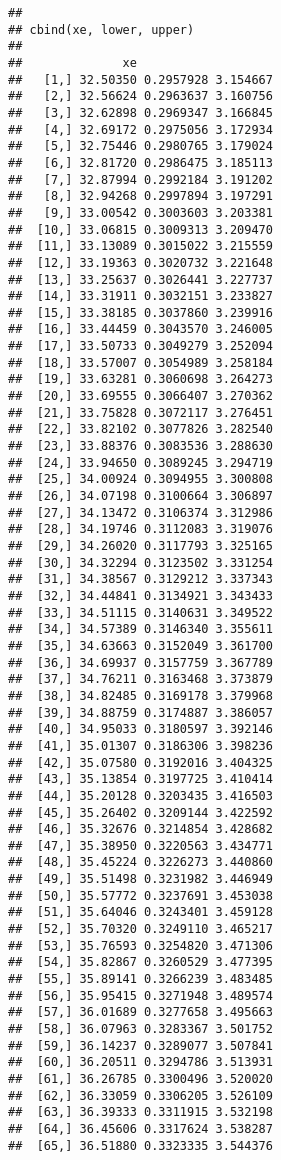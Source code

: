 \documentclass[]{book}
\theoremstyle{definition}
\theoremstyle{definition}
\theoremstyle{definition}
\theoremstyle{remark}
\begin{document}
\begin{verbatim}
## 
## cbind(xe, lower, upper)
## 
##              xe                   
##   [1,] 32.50350 0.2957928 3.154667
##   [2,] 32.56624 0.2963637 3.160756
##   [3,] 32.62898 0.2969347 3.166845
##   [4,] 32.69172 0.2975056 3.172934
##   [5,] 32.75446 0.2980765 3.179024
##   [6,] 32.81720 0.2986475 3.185113
##   [7,] 32.87994 0.2992184 3.191202
##   [8,] 32.94268 0.2997894 3.197291
##   [9,] 33.00542 0.3003603 3.203381
##  [10,] 33.06815 0.3009313 3.209470
##  [11,] 33.13089 0.3015022 3.215559
##  [12,] 33.19363 0.3020732 3.221648
##  [13,] 33.25637 0.3026441 3.227737
##  [14,] 33.31911 0.3032151 3.233827
##  [15,] 33.38185 0.3037860 3.239916
##  [16,] 33.44459 0.3043570 3.246005
##  [17,] 33.50733 0.3049279 3.252094
##  [18,] 33.57007 0.3054989 3.258184
##  [19,] 33.63281 0.3060698 3.264273
##  [20,] 33.69555 0.3066407 3.270362
##  [21,] 33.75828 0.3072117 3.276451
##  [22,] 33.82102 0.3077826 3.282540
##  [23,] 33.88376 0.3083536 3.288630
##  [24,] 33.94650 0.3089245 3.294719
##  [25,] 34.00924 0.3094955 3.300808
##  [26,] 34.07198 0.3100664 3.306897
##  [27,] 34.13472 0.3106374 3.312986
##  [28,] 34.19746 0.3112083 3.319076
##  [29,] 34.26020 0.3117793 3.325165
##  [30,] 34.32294 0.3123502 3.331254
##  [31,] 34.38567 0.3129212 3.337343
##  [32,] 34.44841 0.3134921 3.343433
##  [33,] 34.51115 0.3140631 3.349522
##  [34,] 34.57389 0.3146340 3.355611
##  [35,] 34.63663 0.3152049 3.361700
##  [36,] 34.69937 0.3157759 3.367789
##  [37,] 34.76211 0.3163468 3.373879
##  [38,] 34.82485 0.3169178 3.379968
##  [39,] 34.88759 0.3174887 3.386057
##  [40,] 34.95033 0.3180597 3.392146
##  [41,] 35.01307 0.3186306 3.398236
##  [42,] 35.07580 0.3192016 3.404325
##  [43,] 35.13854 0.3197725 3.410414
##  [44,] 35.20128 0.3203435 3.416503
##  [45,] 35.26402 0.3209144 3.422592
##  [46,] 35.32676 0.3214854 3.428682
##  [47,] 35.38950 0.3220563 3.434771
##  [48,] 35.45224 0.3226273 3.440860
##  [49,] 35.51498 0.3231982 3.446949
##  [50,] 35.57772 0.3237691 3.453038
##  [51,] 35.64046 0.3243401 3.459128
##  [52,] 35.70320 0.3249110 3.465217
##  [53,] 35.76593 0.3254820 3.471306
##  [54,] 35.82867 0.3260529 3.477395
##  [55,] 35.89141 0.3266239 3.483485
##  [56,] 35.95415 0.3271948 3.489574
##  [57,] 36.01689 0.3277658 3.495663
##  [58,] 36.07963 0.3283367 3.501752
##  [59,] 36.14237 0.3289077 3.507841
##  [60,] 36.20511 0.3294786 3.513931
##  [61,] 36.26785 0.3300496 3.520020
##  [62,] 36.33059 0.3306205 3.526109
##  [63,] 36.39333 0.3311915 3.532198
##  [64,] 36.45606 0.3317624 3.538287
##  [65,] 36.51880 0.3323335 3.544376

\end{verbatim}
\end{document}
